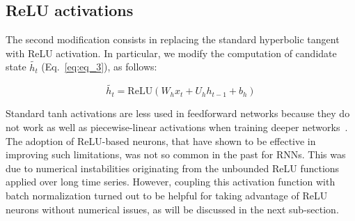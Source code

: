 \documentclass[journal]{IEEEtran}
\begin{document}
\subsection{ReLU activations}
The second modification consists in replacing the standard hyperbolic tangent with ReLU activation. In particular, we modify the computation of candidate state $\widetilde{h_{t}}$ (Eq.~\ref{eq:eq_3}), as follows:

\begin{equation}
\widetilde{h_{t}}=\mbox{ReLU}(W_{h}x_{t}+U_{h}h_{t-1}+b_{h})
\end{equation}

Standard tanh activations are less used in feedforward networks because they do not work as well as piecewise-linear activations when training deeper networks~\cite{xavier}. The adoption of ReLU-based neurons, that have shown to be effective in improving such limitations, was not so common in the past for RNNs. This was due to numerical instabilities originating from the unbounded ReLU functions applied over long time series. However, coupling this activation function with batch normalization turned out to be helpful for taking advantage of ReLU neurons without numerical issues, as will be discussed in the next sub-section.
\end{document}
